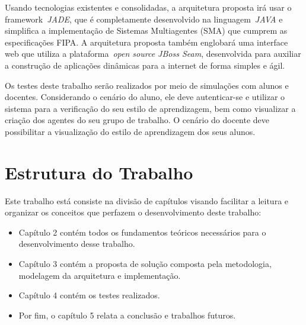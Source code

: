 Usando tecnologias existentes e consolidadas, a arquitetura proposta irá usar o framework~\emph{JADE}, que é completamente desenvolvido na linguagem~\emph{JAVA} e simplifica a implementação de Sistemas Multiagentes (SMA) que cumprem as especificações FIPA. A arquitetura proposta também englobará uma interface web que utiliza a plataforma~\emph{open source JBoss Seam}, desenvolvida para auxiliar a construção de aplicações dinâmicas para a internet de forma simples e ágil.

Os testes deste trabalho serão realizados por meio de simulações com alunos e docentes. Considerando o cenário do aluno, ele deve autenticar-se e utilizar o sistema para a verificação do seu estilo de aprendizagem, bem como visualizar a criação dos agentes do seu grupo de trabalho. O cenário do docente deve possibilitar a visualização do estilo de aprendizagem dos seus alunos.

\section{Estrutura do Trabalho}
Este trabalho está  consiste na divisão de capítulos visando facilitar a leitura e organizar os conceitos que perfazem o desenvolvimento deste trabalho:
\begin{itemize}
	\item Capítulo 2 contém todos os fundamentos teóricos necessários para o desenvolvimento desse trabalho.
	\item Capítulo 3 contém a proposta de solução composta pela metodologia, modelagem da arquitetura e implementação.
	\item Capítulo 4 contém os testes realizados.
	\item Por fim, o capítulo 5 relata a conclusão e trabalhos futuros.
\end{itemize}
